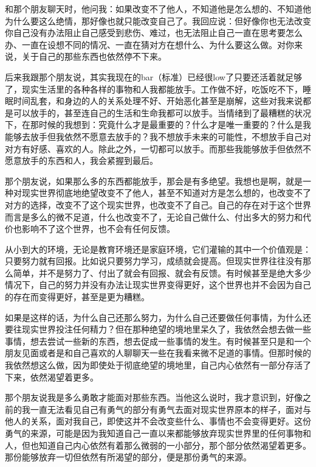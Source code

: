 和那个朋友聊天时，他问我：如果改变不了他人，不知道他是怎么想的、不知道他为什么要这么绝情，那好像也就只能改变自己了。我回应说：但好像你也无法改变你自己\pozhehao{}没有办法阻止自己感受到悲伤、难过，也无法阻止自己一直在思考要怎么办、一直在设想不同的情况、一直在猜对方在想什么、为什么要这么做。对你来说，关于自己的那些东西也依然停不下来。

后来我跟那个朋友说，其实我现在的bar（标准）已经很low了\pozhehao{}只要还活着就足够了，现实生活里的各种各样的事物和人我都能放手。工作做不好，吃饭吃不下，睡眠时间乱套，和身边的人的关系处理不好、开始恶化甚至是崩解，这些对我来说都是可以放手的，甚至连自己的生活和生命我都可以放手。当情绪到了最糟糕的状况下，在那时候的我想到：究竟什么才是最重要的？什么才是唯一重要的？什么是我能够去放手但我依然不愿意去放手的？我不想放手未来的可能性，不想放手自己对对方有好感、喜欢的人。除此之外，一切都可以放手。而那些我能够放手但依然不愿意放手的东西和人，我会紧握到最后。

那个朋友说，如果那么多的东西都能放手，那会是有多绝望。我想也是啊，就是一种对现实世界彻底地绝望\pozhehao{}改变不了他人，甚至不知道对方是怎么想的，也改变不了对方的选择，改变不了这个现实世界，也改变不了自己。自己的存在对于这个世界而言是多么的微不足道，什么也改变不了，无论自己做什么、付出多大的努力和代价也影响不了这个世界，也不会有任何反馈。

从小到大的环境，无论是教育环境还是家庭环境，它们灌输的其中一个价值观是：只要努力就有回报。比如说只要努力学习，成绩就会提高。但现实世界往往没有那么简单，并不是努力了、付出了就会有回报、就会有反馈。有时候甚至是绝大多少情况下，自己的努力并没有办法让现实世界变得更好，这个世界也并不会因为自己的存在而变得更好，甚至是更为糟糕。

如果是这样的话，为什么自己还那么努力，为什么自己还要做任何事情，为什么还要往现实世界投注任何精力？但在那种绝望的境地里呆久了，我依然会想去做一些事情，想去尝试一些新的东西，想去促成一些事情的发生。有时候甚至只是和一个朋友见面或者是和自己喜欢的人聊聊天\pozhehao{}一些在我看来微不足道的事情。但那时候的我依然想这么做，因为即使处于彻底绝望的境地里，自己内心依然有一部分存活了下来，依然渴望着更多。

那个朋友说我是多么勇敢才能面对那些东西。当他这么说时，我才意识到，好像之前的我一直无法看见自己有勇气的部分\pozhehao{}有勇气去面对现实世界原本的样子，面对与他人的关系，面对我自己，即使这并不会改变些什么、事情也不会变得更好。这份勇气的来源，可能是因为我知道自己一直以来都能够放弃现实世界里的任何事物和人，但也知道自己内心依然有着那么微弱的一小部分，那个部分依然渴望着更多。那份能够放弃一切但依然有所渴望的部分，便是那份勇气的来源。

